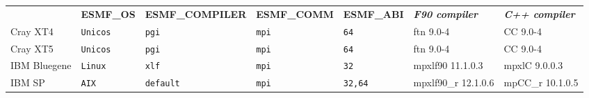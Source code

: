 \begin{tabular}{lllllll}
  &{\bfseries\footnotesize ESMF\_OS} &{\bfseries\footnotesize ESMF\_COMPILER} & {\bfseries\footnotesize ESMF\_COMM} & {\bfseries\footnotesize ESMF\_ABI} &
  {\bfseries\footnotesize\it F90 compiler} & {\bfseries\footnotesize\it C++ compiler} \\

Cray XT4              &\tt Unicos &\tt pgi          &\tt mpi        &\tt 64              & ftn \footnotesize 9.0-4            & CC \footnotesize 9.0-4          \\ %
Cray XT5              &\tt Unicos &\tt pgi          &\tt mpi        &\tt 64              & ftn \footnotesize 9.0-4            & CC \footnotesize 9.0-4          \\ %
IBM Bluegene          &\tt Linux  &\tt xlf          &\tt mpi        &\tt 32              & mpxlf90 \footnotesize 11.1.0.3     & mpxlC \footnotesize 9.0.0.3     \\ %
IBM SP                &\tt AIX    &\tt default      &\tt mpi        &\tt 32,64           & mpxlf90\_r \footnotesize 12.1.0.6  & mpCC\_r \footnotesize 10.1.0.5  \\ %

\end{tabular}
